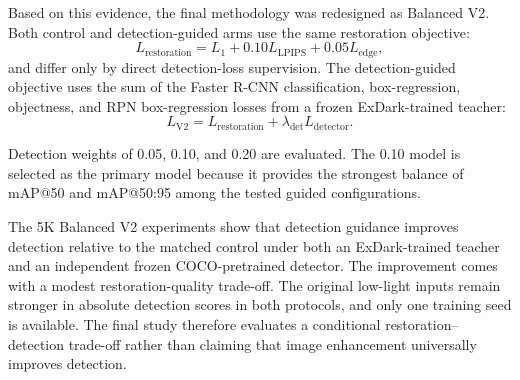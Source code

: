 Based on this evidence, the final methodology was redesigned as Balanced
V2. Both control and detection-guided arms use the same restoration
objective:
\[
L_{\mathrm{restoration}}
=
L_1
+
0.10L_{\mathrm{LPIPS}}
+
0.05L_{\mathrm{edge}},
\]
and differ only by direct detection-loss supervision. The detection-guided
objective uses the sum of the Faster R-CNN classification, box-regression,
objectness, and RPN box-regression losses from a frozen ExDark-trained
teacher:
\[
L_{\mathrm{V2}}
=
L_{\mathrm{restoration}}
+
\lambda_{\mathrm{det}}L_{\mathrm{detector}}.
\]

Detection weights of 0.05, 0.10, and 0.20 are evaluated. The 0.10 model is
selected as the primary model because it provides the strongest balance of
mAP@50 and mAP@50:95 among the tested guided configurations.

The 5K Balanced V2 experiments show that detection guidance improves
detection relative to the matched control under both an ExDark-trained
teacher and an independent frozen COCO-pretrained detector. The improvement
comes with a modest restoration-quality trade-off. The original low-light
inputs remain stronger in absolute detection scores in both protocols, and
only one training seed is available. The final study therefore evaluates a
conditional restoration--detection trade-off rather than claiming that
image enhancement universally improves detection.

